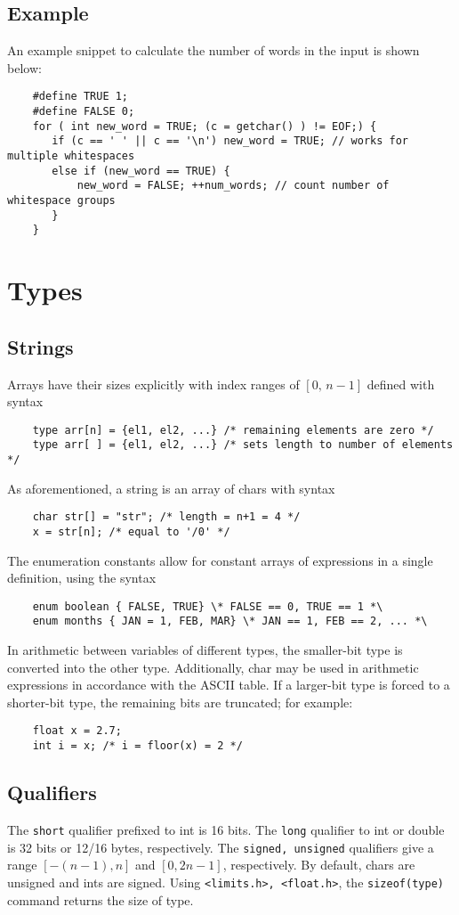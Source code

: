 \documentclass{tufte-book}
\begin{document}
\begin{fullwidth}
\section{Example}
An example snippet to calculate the number of words in the input is shown below:
\begin{lstlisting}
    #define TRUE 1;
    #define FALSE 0;
    for ( int new_word = TRUE; (c = getchar() ) != EOF;) {
       if (c == ' ' || c == '\n') new_word = TRUE; // works for multiple whitespaces
       else if (new_word == TRUE) {
           new_word = FALSE; ++num_words; // count number of whitespace groups
       }
    }
\end{lstlisting}

\chapter{Types}
\section{Strings}
Arrays have their sizes explicitly with index ranges of $[0, \, n-1]$ defined with syntax
\begin{lstlisting}
    type arr[n] = {el1, el2, ...} /* remaining elements are zero */
    type arr[ ] = {el1, el2, ...} /* sets length to number of elements */
\end{lstlisting}
As aforementioned, a string is an array of chars with syntax
\begin{lstlisting}
    char str[] = "str"; /* length = n+1 = 4 */
    x = str[n]; /* equal to '/0' */
\end{lstlisting}
The enumeration constants allow for constant arrays of expressions in a single definition, using the syntax
\begin{lstlisting}
    enum boolean { FALSE, TRUE} \* FALSE == 0, TRUE == 1 *\
    enum months { JAN = 1, FEB, MAR} \* JAN == 1, FEB == 2, ... *\
\end{lstlisting}
In arithmetic between variables of different types, the smaller-bit type is converted into the other type. Additionally, char may be used in arithmetic expressions in accordance with the ASCII table. If a larger-bit type is forced to a shorter-bit type, the remaining bits are truncated; for example:
\begin{lstlisting}
    float x = 2.7;
    int i = x; /* i = floor(x) = 2 */
\end{lstlisting}

\section{Qualifiers}
The \lstinline{short} qualifier prefixed to int is 16 bits. The \lstinline{long} qualifier to int or double is 32 bits or 12/16 bytes, respectively. The \lstinline{signed, unsigned} qualifiers give a range $[-(n-1), n]$ and $[0, 2n-1]$, respectively. By default, chars are unsigned and ints are signed. Using \lstinline{<limits.h>, <float.h>}, the \lstinline{sizeof(type)} command returns the size of type.


\end{fullwidth}
\end{document}

